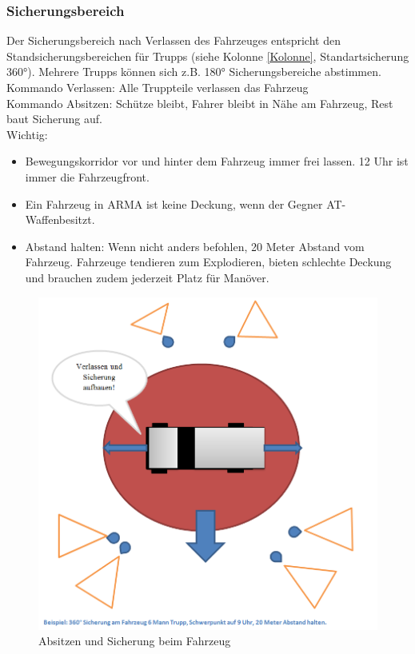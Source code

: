 \subsubsection{Sicherungsbereich}
Der Sicherungsbereich nach Verlassen des Fahrzeuges entspricht den Standsicherungsbereichen für  Trupps (siehe Kolonne \autoref{Kolonne}, Standartsicherung 360°). Mehrere Trupps können sich z.B. 180° Sicherungsbereiche abstimmen. \\
Kommando Verlassen:  Alle Truppteile verlassen das Fahrzeug \\
Kommando Absitzen: Schütze bleibt, Fahrer bleibt in Nähe am Fahrzeug, Rest baut Sicherung auf.  \\
Wichtig:
\begin{itemize}
\item Bewegungskorridor vor und hinter dem Fahrzeug immer frei lassen. 12 Uhr ist immer die Fahrzeugfront.
\item Ein Fahrzeug in ARMA ist keine Deckung, wenn der Gegner AT-Waffenbesitzt.
\item Abstand halten:  Wenn nicht anders befohlen, 20 Meter Abstand vom Fahrzeug. Fahrzeuge tendieren zum Explodieren, bieten schlechte Deckung  und brauchen zudem jederzeit Platz für Manöver.
\end{itemize}
\begin{figure}[htbp]
	\centering
	\includegraphics[width=15cm]{./Grafiken/Abschnitt/Fahrzeug_verlassen.png}
	\caption{Absitzen und Sicherung beim Fahrzeug}
\end{figure}
